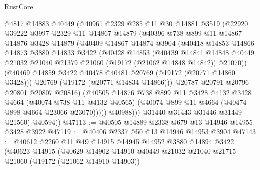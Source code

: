 \begin{lexlean}{RustCore}
\begin{coremodule}
              @4817
              @14883
              @40449
              (@40961
                @2329
                @285
                @11
                @30
                @14881
                @3519
                (@22920
                  @39222
                  @3997
                  @2329
                  @11
                  @14867
                  @14879
                  (@40396
                    @738
                    @899
                    @11
                    @14867
                    @14876
                    @3428
                    @14879
                    (@40409
                      @14867
                      @14874
                      @3904
                      (@40418
                        @14853
                        @14866
                        @14873
                        @3880
                        @14833
                        @3422
                        (@40428
                          @14853
                          (@40439
                            @14841
                            @14848
                            @40449
                            @21032
                            @21040
                            @21379
                            @21060
                            (@19172 (@21062 @14848 @14842))
                            @21070))
                        (@40469 @14859 @3422 @40478 @40481 @20769 (@19172 (@20771 @14860 @3428)))
                        @20769
                        (@19172 (@20771 @14834 @14866)))
                      @20787
                      @20791
                      @20796
                      @20801
                      @20807
                      @20816)
                    (@40505
                      @14876
                      @738
                      @899
                      @11
                      @3428
                      @4132
                      @3428
                      @4664
                      (@40074 @738 @11 @4132 @40565)
                      (@40074 @899 @11 @4664 (@40474 @898 @4664 @23066 @23070)))))
                @40988)))
          @31440
          @31443
          @31446
          @31449
          @21560)
        @40594))
@47113 := @40505 @14889 @2338 @679 @13 @14946 @14955 @3428 @3922
@47119 := @40406 @2337 @50 @13 @14946 @14953 @3904
@47143 := @40612
    @2260
    @11
    @49
    @14915
    @14945
    @14952
    @3880
    @14894
    @3422
    (@40623
      @14915
      (@40629
        @14902
        @14910
        @40449
        @21032
        @21040
        @21715
        @21060
        (@19172 (@21062 @14910 @14903))

\end{coremodule}
\end{lexlean}
